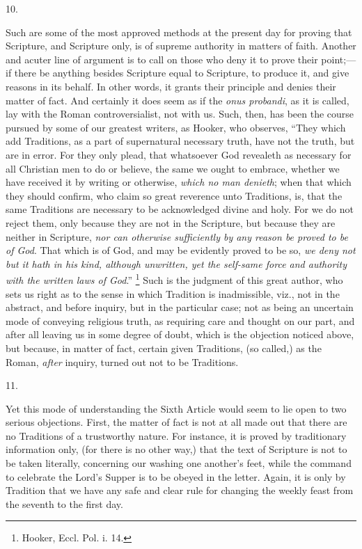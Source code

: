 10.

Such are some of the most approved methods at the present day for
proving that Scripture, and Scripture only, is of supreme authority in
matters of faith. Another and acuter line of argument is to call
on those who deny it to prove their point;—if there be anything
besides Scripture equal to Scripture, to produce it, and give reasons
in its behalf. In other words, it grants their principle and denies
their matter of fact. And certainly it does seem as if the \emph{onus
probandi}, as it is called, lay with the Roman controversialist,
not with us. Such, then, has been the course pursued by some of our
greatest writers, as Hooker, who observes, ``They which add
Traditions, as a part of supernatural necessary truth, have not the
truth, but are in error. For they only plead, that whatsoever God
revealeth as necessary for all Christian men to do or believe, the
same we ought to embrace, whether we have received it by writing or
otherwise, \emph{which no man denieth}; when that which they should
confirm, who claim so great reverence unto Traditions, is, that the
same Traditions are necessary to be acknowledged divine and holy. For
we do not reject them, only because they are not in the Scripture, but
because they are neither in Scripture, \emph{nor can otherwise
sufficiently by any reason be proved to be of God}. That which is
of God, and may be evidently proved to be so, \emph{we deny not but it
hath in his kind, although unwritten, yet the self-same force and
authority with the written laws of God}.'' \footnote{Hooker, Eccl. Pol. i. 14.} Such is the judgment of this great author, who sets us right
as to the sense in which Tradition is inadmissible, viz., not in the
abstract, and before inquiry, but in the particular case; not as being
an uncertain mode of conveying religious truth, as requiring care and
thought on our part, and after all leaving us in some degree of doubt,
which is the objection noticed above, but because, in matter of fact,
certain given Traditions, (so called,) as the Roman, \emph{after}
inquiry, turned out not to be Traditions.

11.

Yet this mode of understanding the Sixth Article would seem to lie
open to two serious objections. First, the matter of fact is not at
all made out that there are no Traditions of a trustworthy nature. For
instance, it is proved by traditionary information only, (for there is
no other way,) that the text of Scripture is not to be taken
literally, concerning our washing one another's feet, while the
command to celebrate the Lord's Supper is to be obeyed in the letter.
Again, it is only by Tradition that we have any safe and clear rule
for changing the weekly feast from the seventh to the first day.

